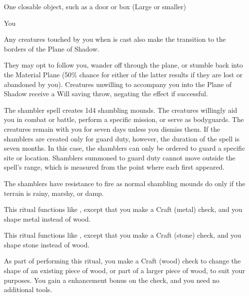 \begin{spelltarget}{One closable object, such as a door or box (Large or smaller)}
\begin{spelltarget}{You}
\par Any creatures touched by you when  is cast also make the transition to the borders of the Plane of Shadow.
\par They may opt to follow you, wander off through the plane, or stumble back into the Material Plane (50\% chance for either of the latter results if they are lost or abandoned by you). Creatures unwilling to accompany you into the Plane of Shadow receive a Will saving throw, negating the effect if successful.

\spelleffect The shambler spell creates 1d4 shambling mounds. The creatures willingly aid you in combat or battle, perform a specific mission, or serve as bodyguards. The creatures remain with you for seven days unless you dismiss them. If the shamblers are created only for guard duty, however, the duration of the spell is seven months. In this case, the shamblers can only be ordered to guard a specific site or location. Shamblers summoned to guard duty cannot move outside the spell's range, which is measured from the point where each first appeared. 
\par The shamblers have resistance to fire as normal shambling mounds do only if the terrain is rainy, marshy, or damp.

\spelleffect This ritual functions like , except that you make a Craft (metal) check, and you shape metal instead of wood. 

\spelleffect This ritual functions like , except that you make a Craft (stone) check, and you shape stone instead of wood.

\spelleffect As part of performing this ritual, you make a Craft (wood) check to change the shape of an existing piece of wood, or part of a larger piece of wood, to suit your purposes. You gain a  enhancement bonus on the check, and you need no additional tools.


\end{spelltarget}
\end{spelltarget}
